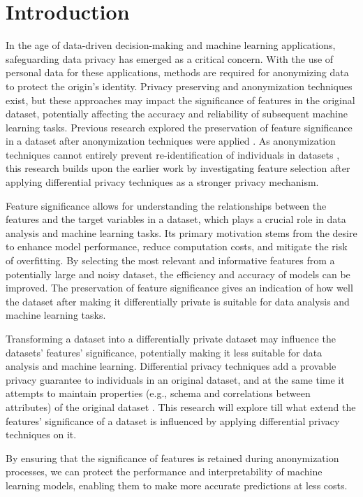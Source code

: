 \chapter{Introduction}
\label{ch:introduction}
In the age of data-driven decision-making and machine learning applications, safeguarding data privacy has emerged as a critical concern. With the use of personal data for these applications, methods are required for anonymizing data to protect the origin's identity. Privacy preserving and anonymization techniques exist, but these approaches may impact the significance of features in the original dataset, potentially affecting the accuracy and reliability of subsequent machine learning tasks. Previous research explored the preservation of feature significance in a dataset after anonymization techniques were applied \cite{originalpaper}. As anonymization techniques cannot entirely prevent re-identification of individuals in datasets \cite{dpuitleg}, this research builds upon the earlier work by investigating feature selection after applying differential privacy techniques as a stronger privacy mechanism.

Feature significance allows for understanding the relationships between the features and the target variables in a dataset, which plays a crucial role in data analysis and machine learning tasks. Its primary motivation stems from the desire to enhance model performance, reduce computation costs, and mitigate the risk of overfitting. By selecting the most relevant and informative features from a potentially large and noisy dataset, the efficiency and accuracy of models can be improved. The preservation of feature significance gives an indication of how well the dataset after making it differentially private is suitable for data analysis and machine learning tasks.

Transforming a dataset into a differentially private dataset may influence the datasets' features' significance, potentially making it less suitable for data analysis and machine learning. Differential privacy techniques add a provable privacy guarantee to individuals in an original dataset, and at the same time it attempts to maintain properties (e.g., schema and correlations between attributes) of the original dataset \cite{dpuitleg}. This research will explore till what extend the features' significance of a dataset is influenced by applying differential privacy techniques on it.

By ensuring that the significance of features is retained during anonymization processes, we can protect the performance and interpretability of machine learning models, enabling them to make more accurate predictions at less costs.\\

